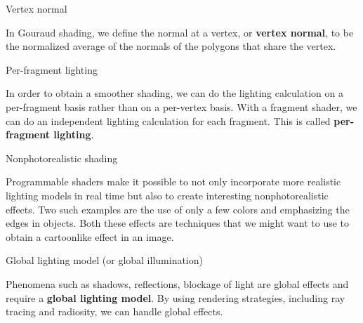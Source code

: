 \documentclass[10pt,a4paper]{article}
\begin{document}
\begin{enumerate}
		
		{\large \item Vertex normal}
		
			In Gouraud shading, we define the normal at a vertex, or \textbf{vertex normal}, to be the normalized average of the normals of the polygons that share the vertex.\\
		
		{\large \item Per-fragment lighting}
	
			In order to obtain a smoother shading, we can do the lighting calculation on a per-fragment basis rather than on a per-vertex basis. With a fragment shader, we can do an independent lighting calculation for each fragment. This is called \textbf{per-fragment lighting}.\\
			
		
		{\large \item Nonphotorealistic shading}
		
			Programmable shaders make it possible to not only incorporate more realistic lighting models in real time but also to create interesting nonphotorealistic effects. Two such examples are the use of only a few colors and emphasizing the edges in objects. Both these effects are techniques that we might want to use to obtain a cartoonlike effect in an image.\\
			
		{\large \item Global lighting model (or global illumination)}
			
			Phenomena such as shadows, reflections, blockage of light are global effects and require a \textbf{global lighting model}. By using rendering strategies, including ray tracing and radiosity, we can handle global effects.
	\end{enumerate}
\end{document}
